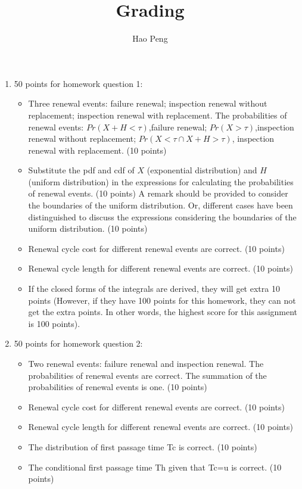 \documentclass[10pt,a4paper]{article}
\author{Hao Peng}
\title{Grading}
\begin{document}
\maketitle
\begin{enumerate}
\item 50 points for homework question 1:
\begin{itemize}
\item Three renewal events: failure renewal; inspection renewal without replacement; inspection renewal with replacement. The probabilities of renewal events: $Pr(X+H<\tau)$,failure renewal; $Pr(X>\tau)$,inspection renewal without replacement; $Pr(X<\tau \cap X+H>\tau)$, inspection renewal with replacement. (10 points)
\item Substitute the pdf and cdf of $X$ (exponential distribution) and $H$ (uniform distribution) in the expressions for calculating the probabilities of renewal events. (10 points) A remark should be provided to consider the boundaries of the uniform distribution. Or, different cases have been distinguished to discuss the expressions considering the boundaries of the uniform distribution. (10 points)
\item Renewal cycle cost for different renewal events are correct. (10 points)
\item Renewal cycle length for different renewal events are correct. (10 points)  
\item If the closed forms of the integrals are derived, they will get extra 10 points (However, if they have 100 points for this homework, they can not get the extra points. In other words, the highest score for this assignment is 100 points).
\end{itemize}
\item 50 points for homework question 2:
\begin{itemize}
\item Two renewal events: failure renewal and inspection renewal. The probabilities of renewal events are correct. The summation of the probabilities of renewal events is one. (10 points)
\item Renewal cycle cost for different renewal events are correct. (10 points)
\item Renewal cycle length for different renewal events are correct. (10 points) 
\item The distribution of first passage time Tc is correct. (10 points)
\item The conditional first passage time Th given that Tc=u is correct. (10 points)

\end{itemize}
\end{enumerate}
\end{document}
